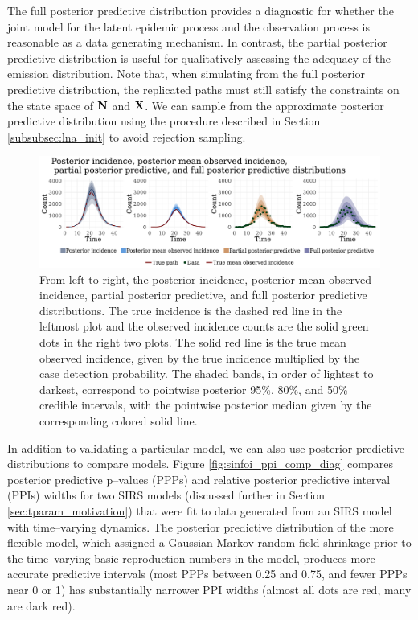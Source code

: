 The full posterior predictive distribution provides a diagnostic for whether the joint model for the latent epidemic process and the observation process is reasonable as a data generating mechanism. In contrast, the partial posterior predictive distribution is useful for qualitatively assessing the adequacy of the emission distribution. Note that, when simulating from the full posterior predictive distribution, the replicated paths must still satisfy the constraints on the state space of $ \mathbf{N} $ and $ \mathbf{X} $. We can sample from the approximate posterior predictive distribution using the procedure described in Section \ref{subsubsec:lna_init} to avoid rejection sampling. 
\begin{figure}[htbp]
	\centering
	\includegraphics[width=\linewidth]{figures/sir_diag_plots}
	\caption[SIR model posterior incidence, posterior mean observed incidence, partial posterior predictive, and full posterior distributions.]{From left to right, the posterior incidence, posterior mean observed incidence, partial posterior predictive, and full posterior predictive distributions. The true incidence is the dashed red line in the leftmost plot and the observed incidence counts are the solid green dots in the right two plots. The solid red line is the true mean observed incidence, given by the true incidence multiplied by the case detection probability. The shaded bands, in order of lightest to darkest, correspond to pointwise posterior 95\%, 80\%, and 50\% credible intervals, with the pointwise posterior median given by the corresponding colored solid line.}
	\label{fig:sirdiagplots}
\end{figure}

In addition to validating a particular model, we can also use posterior predictive distributions to compare models. Figure \ref{fig:sinfoi_ppi_comp_diag} compares posterior predictive p--values (PPPs) and relative posterior predictive interval (PPIs) widths for two SIRS models (discussed further in Section \ref{sec:tparam_motivation}) that were fit to data generated from an SIRS model with time--varying dynamics. The posterior predictive distribution of the more flexible model, which assigned a Gaussian Markov random field shrinkage prior to the time--varying basic reproduction numbers in the model,  produces more accurate predictive intervals (most PPPs between 0.25 and 0.75, and fewer PPPs near 0 or 1) has substantially narrower PPI widths (almost all dots are red, many are dark red). 

